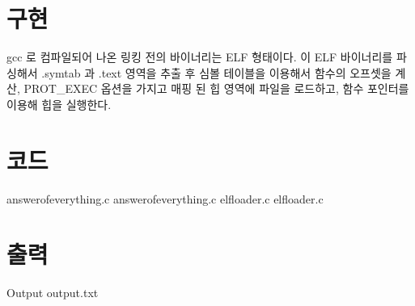 \documentclass {article}
\begin{document}
\section{구현}
gcc 로 컴파일되어 나온 링킹 전의 바이너리는 ELF 형태이다. 이 ELF 바이너리를 파싱해서 .symtab 과 .text 영역을 추출 후 심볼 테이블을 이용해서 함수의 오프셋을 계산, PROT\_EXEC 
옵션을 가지고 매핑 된 힙 영역에 파일을 로드하고, 함수 포인터를 이용해 힙을 실행한다.

\section{코드}
answerofeverything.c
{answerofeverything.c}
elfloader.c
{elfloader.c}
\section{출력}
Output
{output.txt}
\end{document}

